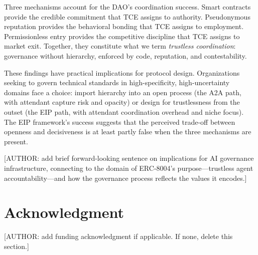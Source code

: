 \documentclass[conference]{IEEEtran}
\begin{document}
Three mechanisms account for the DAO's coordination success. Smart contracts
provide the credible commitment that TCE assigns to authority. Pseudonymous
reputation provides the behavioral bonding that TCE assigns to employment.
Permissionless entry provides the competitive discipline that TCE assigns
to market exit. Together, they constitute what we term \textit{trustless
coordination}: governance without hierarchy, enforced by code, reputation,
and contestability.

These findings have practical implications for protocol design. Organizations
seeking to govern technical standards in high-specificity, high-uncertainty
domains face a choice: import hierarchy into an open process (the A2A path,
with attendant capture risk and opacity) or design for trustlessness from the
outset (the EIP path, with attendant coordination overhead and niche focus).
The EIP framework's success suggests that the perceived trade-off between
openness and decisiveness is at least partly false when the three mechanisms
are present.

[AUTHOR: add brief forward-looking sentence on implications for AI governance
infrastructure, connecting to the domain of ERC-8004's purpose---trustless
agent accountability---and how the governance process reflects the values it
encodes.]


\section*{Acknowledgment}

[AUTHOR: add funding acknowledgment if applicable. If none, delete this section.]
\end{document}
